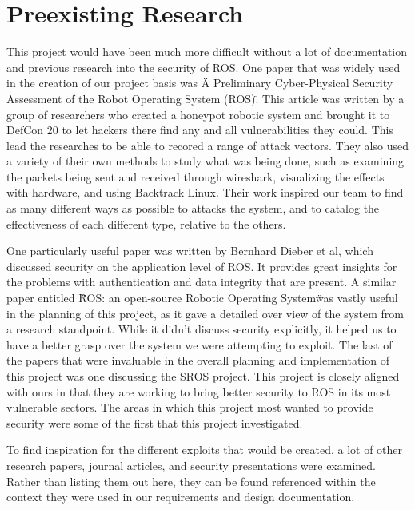 \documentclass[IEEEtran,letterpaper,10pt,notitlepage,draftclsnofoot,onecolumn]{article}
\begin{document}
\section{Preexisting Research}
This project would have been much more difficult without a lot of documentation and previous research into the security of ROS.
One paper that was widely used in the creation of our project basis was \"A Preliminary Cyber-Physical Security Assessment of the Robot
Operating System (ROS)\". \cite{mainROS}
This article was written by a group of researchers who created a honeypot robotic system and brought it to DefCon 20 to let hackers there find any and all vulnerabilities they could.
This lead the researches to be able to recored a range of attack vectors.
They also used a variety of their own methods to study what was being done, such as examining the packets being sent and received through wireshark, visualizing the effects with hardware, and using Backtrack Linux.
Their work inspired our team to find as many different ways as possible to attacks the system, and to catalog the effectiveness of each different type, relative to the others.

One particularly useful paper was written by Bernhard Dieber et al, which discussed security on the application level of ROS. 
It provides great insights for the problems with authentication and data integrity that are present. \cite{App}
A similar paper entitled \"ROS: an open-source Robotic Operating System\" was vastly useful in the planning of this project, as it gave a detailed over view of the system from a research standpoint.
While it didn't discuss security explicitly, it helped us to have a better grasp over the system we were attempting to exploit. \cite{Open}
The last of the papers that were invaluable in the overall planning and implementation of this project was one discussing the SROS project.
This project is closely aligned with ours in that they are working to bring better security to ROS in its most vulnerable sectors.
The areas in which this project most wanted to provide security were some of the first that this project investigated. \cite{Sros}

To find inspiration for the different exploits that would be created, a lot of other research papers, journal articles, and security presentations were examined.
Rather than listing them out here, they can be found referenced within the context they were used in our requirements and design documentation. 
\end{document}
